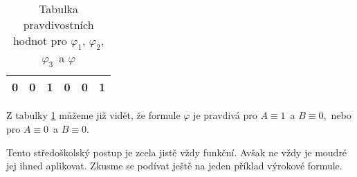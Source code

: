 \begin{example}
\begin{solution}
\begin{table}[H]
\begin{tabular}{|cc|cccc|}
            0   & 0   & 1               & 0                          & 0                    & 1                                          \\ \hline
            \end{tabular}
            \caption{Tabulka pravdivostních hodnot pro $\varphi_1$, $\varphi_2$, $\varphi_3$~a $\varphi$}
            \label{tab:ex_vyrokova_formule_1}
        \end{table}
        Z tabulky \ref{tab:ex_vyrokova_formule_1} můžeme již vidět, že formule $\varphi$ je pravdivá pro $A\equiv 1$~a $B\equiv 0$,~nebo pro $A\equiv 0$~a $B\equiv 0$.
    \end{solution}
\end{example}

Tento středoškolský postup je zcela jistě vždy funkční. Avšak ne vždy je moudré jej ihned aplikovat. Zkusme se podívat ještě na jeden příklad výrokové formule.

